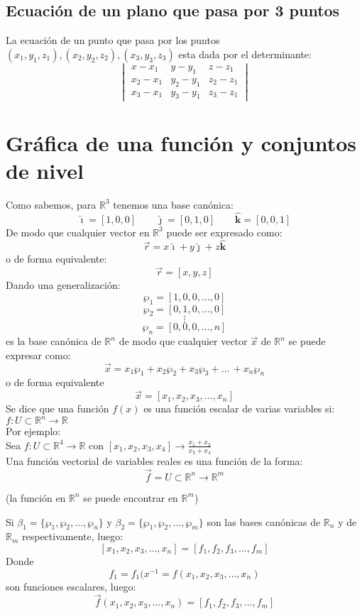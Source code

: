 \documentclass[a4paper]{article}
\newcommand{\ihat}{\boldsymbol{\hat{\imath}}}
\newcommand{\jhat}{\boldsymbol{\hat{\jmath}}}
\newcommand{\khat}{\boldsymbol{\hat{\bm{k}}}}
\begin{document}
\subsection{Ecuación de un plano que pasa por 3 puntos}
La ecuación de un punto que pasa por los puntos $(x_1,y_1,z_1),(x_2,y_2,z_2),(x_3,y_3,z_3)$
esta dada por el determinante:
\[
\begin{vmatrix}
x-x_1   &y-y_1  &z-z_1\\
x_2-x_1 &y_2-y_1&z_2-z_1\\
x_3-x_1 &y_3-y_1&z_3-z_1
\end{vmatrix}
\]
\section{Gráfica de una función y conjuntos de nivel}
Como sabemos, para $\mathbb{R}^3$ tenemos una base canónica:
\[\ihat=[1,0,0]\qquad \jhat=[0,1,0]\qquad \khat=[0,0,1]\]
De modo que cualquier vector en $\mathbb{R}^3$ puede ser expresado como:
\[\vec{r}=x\ihat+y\jhat+z\khat \]
o de forma equivalente:
\[\vec{r}=[x,y,z]\]
Dando una generalización:
\[\wp_1=[1,0,0,\ldots,0]\]
\[\wp_2=[0,1,0,\ldots,0]\]
\[\vdots\]
\[\wp_n=[0,0,0,\ldots,n]\]
es la base canónica de $\mathbb{R}^n$ de modo que cualquier vector $\vec{x}$ de $\mathbb{R}^n$ se puede expresar como:
\[\vec{x}=x_1\wp_1+x_2\wp_2+x_3\wp_3+\ldots\,+x_n\wp_n\]
o de forma equivalente
\[\vec{x}=[x_1,x_2,x_3,\ldots,x_n]\]
Se dice que una función $f(x)$ es una función escalar de varias variables si: $f: U \subset \mathbb{R}^n \rightarrow \mathbb{R}$\\Por ejemplo:\\
\hspace*{3em} Sea $f:U\subset\mathbb{R}^4\rightarrow\mathbb{R}$ con $[x_1,x_2,x_3,x_4]\longrightarrow \frac{x_1+x_2}{x_3+x_4}$\\
Una función vectorial de variables reales es una función de la forma:
\[\vec{f}=U\subset\mathbb{R}^n\longrightarrow\mathbb{R}^m\]
\begin{center}
\small{(la función en $\mathbb{R}^n$ se puede encontrar en $\mathbb{R}^m$)}\\
\end{center}
Si $\beta_1=\{\wp_1,\wp_2,\ldots,\wp_n\}$ y $\beta_2=\{\wp_1,\wp_2,\ldots,\wp_m\}$
son las bases canónicas de $\mathbb{R}_n$ y de $\mathbb{R}_m$ respectivamente, luego:
\[[x_1,x_2,x_3,\ldots,x_n]=[f_1,f_2,f_3,\ldots,f_m]\]
Donde
\[f_1=f_1(x^{-1}=f(x_1,x_2,x_3,\ldots,x_n)\]
son funciones escalares, luego:
\[\vec{f}(x_1,x_2,x_3,\ldots,x_n)=[f_1,f_2,f_3,\ldots,f_m]\]
\end{document}
